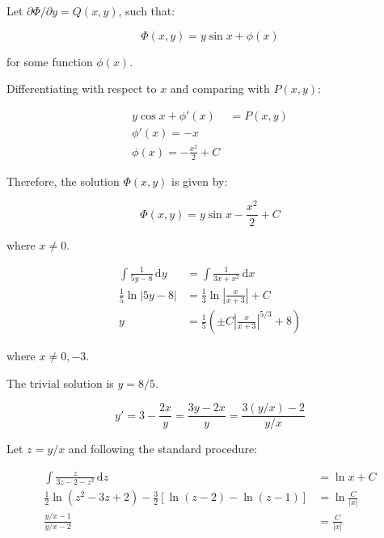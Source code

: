 \documentclass[12pt]{article}
\begin{document}
Let $\partial \Phi/\partial y = Q(x, y)$, such that:

\begin{equation}
    \Phi(x, y) = y \sin{x} + \phi(x)
\end{equation}

for some function $\phi(x)$.

Differentiating with respect to $x$ and comparing with $P(x, y)$:

\begin{equation}
    \begin{split}
        y \cos{x} + \phi'(x) &= P(x, y) \\
        \phi'(x) = -x \\
        \phi(x) = -\frac{x^{2}}{2} + C
    \end{split}
\end{equation}

Therefore, the solution $\Phi(x, y)$ is given by:

\begin{equation}
    \Phi(x, y) = y \sin{x} - \frac{x^{2}}{2} + C
\end{equation}

where $x \ne 0$.


\begin{equation}
    \begin{split}
        \int \frac{1}{5y - 8} \, \mathrm{d}y &= \int \frac{1}{3x + x^{2}} \, \mathrm{d}x \\
        \frac{1}{5} \ln{\left\lvert 5y - 8 \right\rvert} &= \frac{1}{3} \ln{\left\lvert \frac{x}{x + 3} \right\rvert} + C \\
        y &= \frac{1}{5} \left( \pm C \left\lvert \frac{x}{x + 3} \right\rvert^{5/3} + 8 \right)
    \end{split}
\end{equation}

where $x \ne 0, -3$.

The trivial solution is $y = 8/5$.


\begin{equation}
    y' = 3 - \frac{2x}{y} = \frac{3y - 2x}{y} = \frac{3(y/x) - 2}{y/x}
\end{equation}

Let $z = y/x$ and following the standard procedure:

\begin{equation}
    \begin{split}
        \int \frac{z}{3z - 2 - z^{2}} \, \mathrm{d}z &= \ln{x} + C \\
        \frac{1}{2} \ln{(z^{2} - 3z + 2)} - \frac{3}{2} \left[ \ln{(z - 2)} - \ln{(z - 1)} \right] &= \ln{\frac{C}{\left\lvert x \right\rvert}} \\
        \frac{y/x - 1}{y/x - 2} &= \frac{C}{\left\lvert x \right\rvert}
    \end{split}
\end{equation}
\end{document}
